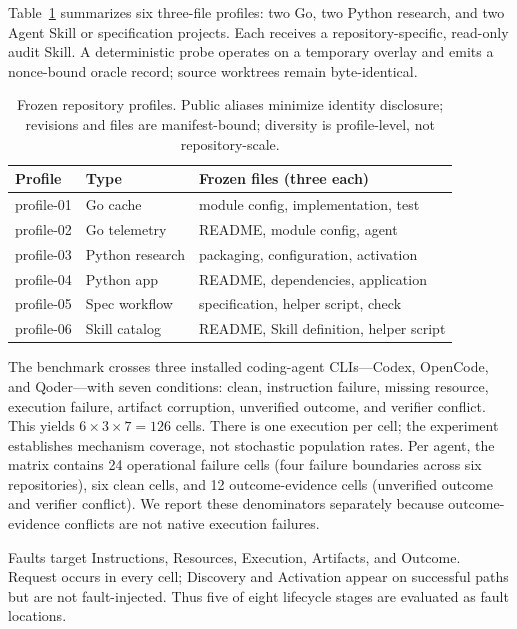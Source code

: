 \documentclass[runningheads]{llncs}
\begin{document}
Table~\ref{tab:profiles} summarizes six three-file profiles: two Go, two Python
research, and two Agent Skill or specification projects.  Each receives a
repository-specific, read-only audit Skill.  A deterministic probe operates on
a temporary overlay and emits a nonce-bound oracle record; source worktrees
remain byte-identical.

\begin{table}[t]
\centering
\caption{Frozen repository profiles. Public aliases minimize identity
disclosure; revisions and files are manifest-bound; diversity is profile-level,
not repository-scale.}
\label{tab:profiles}
\scriptsize
\begin{tabular}{@{}lll@{}}
\toprule
Profile & Type & Frozen files (three each) \\
\midrule
profile-01 & Go cache & module config, implementation, test \\
profile-02 & Go telemetry & README, module config, agent \\
profile-03 & Python research & packaging, configuration, activation \\
profile-04 & Python app & README, dependencies, application \\
profile-05 & Spec workflow & specification, helper script, check \\
profile-06 & Skill catalog & README, Skill definition, helper script \\
\bottomrule
\end{tabular}
\end{table}

The benchmark crosses three installed coding-agent CLIs---Codex, OpenCode, and
Qoder---with seven conditions: clean, instruction failure, missing resource,
execution failure, artifact corruption, unverified outcome, and verifier
conflict.  This yields $6\times3\times7=126$ cells.  There is one execution per
cell; the experiment establishes mechanism coverage, not stochastic population
rates.  Per agent, the matrix contains 24 operational failure cells (four
failure boundaries across six repositories), six clean cells, and 12
outcome-evidence cells (unverified outcome and verifier conflict).  We report
these denominators separately because outcome-evidence conflicts are not native
execution failures.

Faults target Instructions, Resources, Execution, Artifacts, and Outcome.
Request occurs in every cell; Discovery and Activation appear on successful
paths but are not fault-injected. Thus five of eight lifecycle stages are
evaluated as fault locations.
\end{document}
